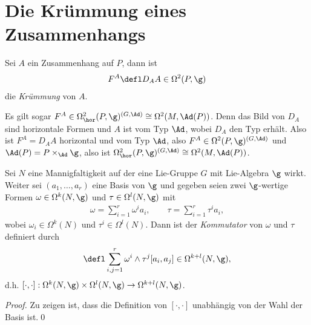 \documentclass[%
	paper=a5,%
	fleqn,%
	DIV=18,%
	BCOR=0mm,
	fontsize=11pt,
	titlepage=false,%
	bibliography=totoc,
	DIV=18,%
	twoside=true,
	pdftitle=Riemannsche Geometrie,
	pdfauthor=Uwe Semmelmann,
	numbers=noendperiod]%
	{scrbook}
\begin{document}
\section{Die Krümmung eines Zusammenhangs}
\label{sec:Krümmung-eines-Zusammenhangs}

\begin{defn}
Sei $A$ ein Zusammenhang auf $P$, dann ist
\begin{align*}
F^A \defl D_A A \in\Omega^2(P,\g)
\end{align*}
die \emph{Krümmung} von $A$.\fish
\end{defn}

\begin{rem}
Es gilt sogar $F^A \in \Omega_\hor^2(P,\g)^{(G,\Ad)} \cong \Omega^2(M,\Ad(P))$.
Denn das Bild von $D_A$ sind horizontale Formen und $A$ ist vom Typ $\Ad$, wobei
$D_A$ den Typ erhält. Also ist $F^A = D_A A$ horizontal und vom Typ $\Ad$, also
$F^A\in\Omega^2(P,\g)^{(G,\Ad)}$ und $\Ad(P) = P\times_\Ad \g$, also ist
$\Omega_\hor^2(P,\g)^{(G,\Ad)} \cong \Omega^2(M,\Ad(P))$.\map 
\end{rem}

\begin{defn}
Sei $N$ eine Mannigfaltigkeit auf der eine Lie-Gruppe $G$ mit Lie-Algebra $\g$
wirkt. Weiter sei $(a_1,\ldots,a_r)$
eine Basis von $\g$ und gegeben seien zwei $\g$-wertige Formen $\omega\in
\Omega^k(N,\g)$ und $\tau\in\Omega^l(N,\g)$ mit
\begin{align*}
\omega = \sum_{i=1}^r \omega^i a_i,\qquad \tau = \sum_{i=1}^r \tau^i a_i,
\end{align*}
wobei $\omega_i\in\Omega^k(N)$ und $\tau^i\in\Omega^l(N)$. Dann ist der
\emph{Kommutator} von $\omega$ und $\tau$ definiert durch
\begin{align*}
[\omega,\tau]\defl \sum_{i,j=1}^r \omega^i \wedge \tau^j [a_i,a_j]
\in\Omega^{k+l}(N,\g),
\end{align*}
d.h. $[\cdot,\cdot]: \Omega^k(N,\g)\times\Omega^l(N,\g) \to
\Omega^{k+l}(N,\g)$.\fish
\end{defn}
\begin{proof}
Zu zeigen ist, dass die Definition von $[\cdot,\cdot]$ unabhängig von der Wahl
der Basis ist.\qed
\end{proof}
\end{document}
